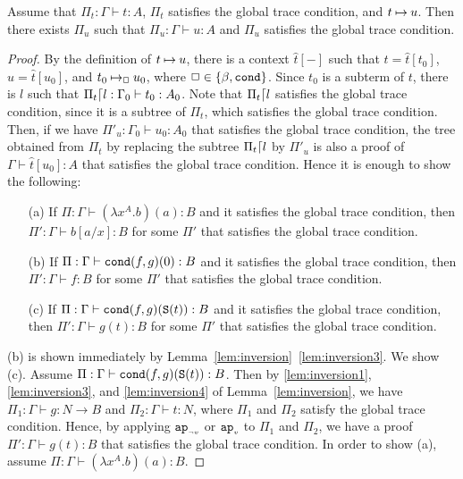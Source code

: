 \begin{theorem}
  Assume that $\Pi_t:\Gamma\vdash t:A$, $\Pi_t$ satisfies the global trace condition, and $t\mathbin{\mapsto} u$.
  Then there exists $\Pi_u$ such that $\Pi_u:\Gamma\vdash u:A$ and $\Pi_u$ satisfies the global trace condition. 
\end{theorem}
\begin{proof}
  By the definition of $t\mathbin{\mapsto} u$, there is a context $\hat{t}[-]$ such that
  $t=\hat{t}[t_0]$, $u=\hat{t}[u_0]$, and $t_0\mathbin{\mapsto}_\Box u_0$, where $\Box\in\{\beta,{\tt cond}\}$. 
  Since $t_0$ is a subterm of $t$, there is $l$ such that $\Pi_t{\lceil} l: \Gamma_0\vdash t_0:A_0$.
  Note that $\Pi_t{\lceil} l$ satisfies the global trace condition,
  since it is a subtree of $\Pi_t$, which satisfies the global trace condition. 
  Then, if we have $\Pi'_u:\Gamma_0\vdash u_0:A_0$ that satisfies the global trace condition,
  the tree obtained from $\Pi_t$ by replacing the subtree $\Pi_t{\lceil} l$ by $\Pi'_u$ is also
  a proof of $\Gamma\vdash \hat{t}[u_0]:A$ that satisfies the global trace condition. 
  Hence it is enough to show the following:
  \begin{itemize}
  \item[(a)]
    If $\Pi:\Gamma \vdash (\lambda x^A.b)(a): B$ and it satisfies the global trace condition,
    then $\Pi':\Gamma \vdash b[a/x]: B$ for some $\Pi'$ that satisfies the global trace condition.
  \item[(b)]
    If $\Pi:\Gamma \vdash {\tt cond}(f,g)(0): B$ and it satisfies the global trace condition,
    then $\Pi':\Gamma \vdash f: B$ for some $\Pi'$ that satisfies the global trace condition. 
  \item[(c)]
    If $\Pi:\Gamma \vdash {\tt cond}(f,g)({\tt S}(t)): B$ and it satisfies the global trace condition,
    then $\Pi':\Gamma \vdash g(t): B$ for some $\Pi'$ that satisfies the global trace condition. 
  \end{itemize}
  (b) is shown immediately by Lemma~\ref{lem:inversion}~\ref{lem:inversion3}.
  We show (c).
  Assume $\Pi:\Gamma \vdash {\tt cond}(f,g)({\tt S}(t)): B$.
  Then by \ref{lem:inversion1}, \ref{lem:inversion3}, and \ref{lem:inversion4} of Lemma~\ref{lem:inversion},
  we have
  $\Pi_1:\Gamma \vdash g:N\to B$ and $\Pi_2:\Gamma \vdash t:N$,
  where $\Pi_1$ and $\Pi_2$ satisfy the global trace condition. 
  Hence, by applying ${{\tt ap}_{\mbox{\tiny $\neg v$}}}$ or ${{\tt ap}_{\mbox{\tiny $v$}}}$ to $\Pi_1$ and $\Pi_2$, 
  we have a proof $\Pi':\Gamma\vdash g(t):B$ that satisfies the global trace condition. 
  In order to show (a), assume $\Pi:\Gamma \vdash (\lambda x^A.b)(a): B$.

\end{proof}

